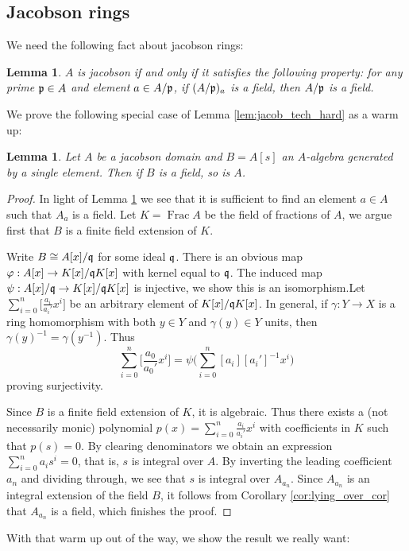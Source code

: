 \documentclass[12pt]{article}
\theoremstyle{plain}
\newtheorem{lemma}[thm]{Lemma}
\theoremstyle{definition}
\begin{document}
\subsection{Jacobson rings}
We need the following fact about jacobson rings:
\begin{lemma}\label{lem:jacob_def}
$A$ is jacobson if and only if it satisfies the following property: for any prime $\frak{p} \in A$ and element $a \in A/\frak{p}$, if $(A/\frak{p})_a$ is a field, then $A/\frak{p}$ is a field.
\end{lemma}
We prove the following special case of Lemma \ref{lem:jacob_tech_hard} as a warm up:
\begin{lemma}\label{lem:jacob_tech_easy}
Let $A$ be a jacobson domain and $B = A[s]$ an $A$-algebra generated by a single element. Then if $B$ is a field, so is $A$.
\end{lemma}
\begin{proof}
In light of Lemma \ref{lem:jacob_def} we see that it is sufficient to find an element $a \in A$ such that $A_a$ is a field. Let $K = \operatorname{Frac}A$ be the field of fractions of $A$, we argue first that $B$ is a finite field extension of $K$.

Write $B \cong A[x]/\frak{q}$ for some ideal $\frak{q}$. There is an obvious map $\varphi: A[x] \to K[x]/\frak{q}K[x]$ with kernel equal to $\frak{q}$. The induced map $\psi: A[x]/\frak{q} \to K[x]/\frak{q}K[x]$ is injective, we show this is an isomorphism.Let $\sum_{i = 0}^n\big[\frac{a_i}{a_i'}x^i\big]$ be an arbitrary element of $K[x]/\frak{q}K[x]$. In general, if $\gamma: Y \to X$ is a ring homomorphism with both $y \in Y$ and $\gamma(y) \in Y$ units, then $\gamma(y)^{-1} = \gamma(y^{-1}).$ Thus 
\[\sum_{i = 0}^n\big[\frac{a_0}{a_0'}x^i\big] = \psi\Big(\sum_{i = 0}^n[a_i][a_i']^{-1}x^i\Big)\]
proving surjectivity.

Since $B$ is a finite field extension of $K$, it is algebraic. Thus there exists a (not necessarily monic) polynomial $p(x) = \sum_{i = 0}^n\frac{a_i}{a_i'}x^i$ with coefficients in $K$ such that $p(s) = 0$. By clearing denominators we obtain an expression $\sum_{i = 0}^na_i s^i = 0$, that is, $s$ is integral over $A$. By inverting the leading coefficient $a_n$ and dividing through, we see that $s$ is integral over $A_{a_n}$. Since $A_{a_n}$ is an integral extension of the field $B$, it follows from Corollary \ref{cor:lying_over_cor} that $A_{a_n}$ is a field, which finishes the proof.
\end{proof}
With that warm up out of the way, we show the result we really want:
\end{document}
